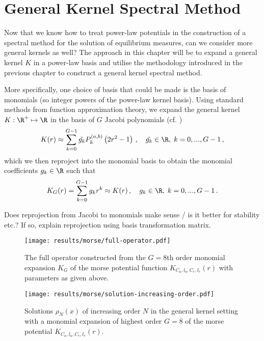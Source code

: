 \chapter{General Kernel Spectral Method}
\label{chap:general-kernel-spectral-method}

Now that we know how to treat power-law potentials in the construction of a spectral method for the solution of equilibrium measures, can we consider more general kernels as well?
The approach in this chapter will be to expand a general kernel $K$ in a power-law basis and utilise the methodology introduced in the previous chapter to construct a general kernel spectral method.

More specifically, one choice of basis that could be made is the basis of monomials (so integer powers of the power-law kernel basis).
Using standard methods from function approximation theory, we expand the general kernel $K: \R^+ \mapsto \R$ in the basis of $G$ Jacobi polynomials (cf. )
$$K(r) \approx \sum_{k=0}^{G-1} \tilde{g_k} P_k^{(a, b)}\left(2 r^2 - 1\right)\,, \quad \tilde{g_k} \in \R, \;k = 0, ..., G-1\,,$$
which we then reproject into the monomial basis to obtain the monomial coefficients $g_k \in \R$ such that
\begin{equation}
  K_G(r) = \sum_{k=0}^{G-1} g_k r^k \approx K(r)\,,\quad g_k \in \R, \;k=0, ..., G-1\,.
  \label{eq:monomial-expansion}
\end{equation}

Does reprojection from Jacobi to monomials make sense / is it better for stability etc.?
If so, explain reprojection using basis transformation matrix.

\begin{figure}[H]
  \centering
  \label{fig:morse-operator}
  \texttt{[image: results/morse/full-operator.pdf]}
  \caption[Full Morse operator]{The full operator constructed from the $G=8$th order monomial expansion $K_G$ of the morse potential function $K_{C_a, l_a, C_r, l_r}(r)$ with parameters as given above.}
\end{figure}

\begin{figure}[H]
  \centering
  \label{fig:morse-solution-increasing-order}
  \texttt{[image: results/morse/solution-increasing-order.pdf]}
  \caption[General kernel solutions of increasing order]{Solutions $\rho_N(x)$ of increasing order $N$ in the general kernel setting with a monomial expansion of highest order $G = 8$ of the morse potential $K_{C_a, l_a, C_r, l_r}(r)$.}
\end{figure}

